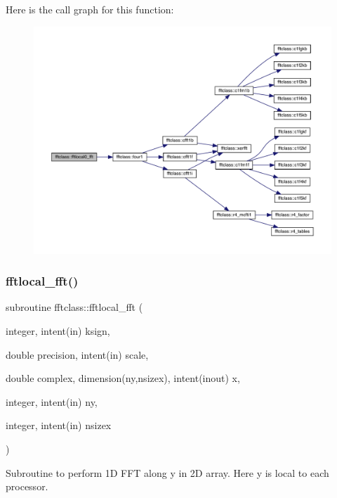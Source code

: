 Here is the call graph for this function\+:\nopagebreak
\begin{figure}[H]
\begin{center}
\leavevmode
\includegraphics[width=350pt]{namespacefftclass_a501325267c1425bfece04a18e20efe31_cgraph}
\end{center}
\end{figure}
\mbox{\label{namespacefftclass_aa64d94b8c8578b384955207a409a2445}} 
\subsubsection{\texorpdfstring{fftlocal\_fft()}{fftlocal\_fft()}}
{\footnotesize\ttfamily subroutine fftclass\+::fftlocal\+\_\+fft (\begin{DoxyParamCaption}\item[{integer, intent(in)}]{ksign,  }\item[{double precision, intent(in)}]{scale,  }\item[{double complex, dimension(ny,nsizex), intent(inout)}]{x,  }\item[{integer, intent(in)}]{ny,  }\item[{integer, intent(in)}]{nsizex }\end{DoxyParamCaption})}



Subroutine to perform 1D F\+FT along y in 2D array. Here y is local to each processor. 

